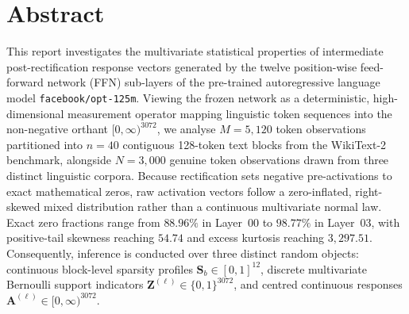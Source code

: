 \documentclass[12pt, a4paper, oneside]{report}
\theoremstyle{definition}
\newcommand{\vect}[1]{\mathbf{#1}}
\begin{document}
\setcounter{page}{2}

\chapter*{Abstract}

This report investigates the multivariate statistical properties of intermediate post-rectification response vectors generated by the twelve position-wise feed-forward network (FFN) sub-layers of the pre-trained autoregressive language model \texttt{facebook/opt-125m}. Viewing the frozen network as a deterministic, high-dimensional measurement operator mapping linguistic token sequences into the non-negative orthant $[0, \infty)^{3072}$, we analyse $M = 5{,}120$ token observations partitioned into $n = 40$ contiguous 128-token text blocks from the WikiText-2 benchmark, alongside $N = 3{,}000$ genuine token observations drawn from three distinct linguistic corpora. Because rectification sets negative pre-activations to exact mathematical zeros, raw activation vectors follow a zero-inflated, right-skewed mixed distribution rather than a continuous multivariate normal law. Exact zero fractions range from $88.96\%$ in Layer~00 to $98.77\%$ in Layer~03, with positive-tail skewness reaching $54.74$ and excess kurtosis reaching $3{,}297.51$. Consequently, inference is conducted over three distinct random objects: continuous block-level sparsity profiles $\vect{S}_b \in [0, 1]^{12}$, discrete multivariate Bernoulli support indicators $\vect{Z}^{(\ell)} \in \{0, 1\}^{3072}$, and centred continuous responses $\vect{A}^{(\ell)} \in [0, \infty)^{3072}$.
\end{document}
